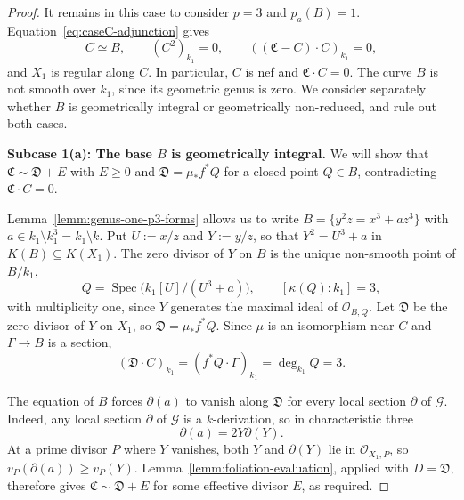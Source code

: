 \documentclass[10pt,abstract=true]{scrartcl}
\numberwithin{equation}{section}
\theoremstyle{definition}
\theoremstyle{remark}
\begin{document}
\begin{proof}
  It remains in this case to consider $p=3$ and $p_a(B)=1$.
  Equation~\eqref{eq:caseC-adjunction} gives
  \begin{equation}\label{eq:caseC-p3-residual}
    C\simeq B,\qquad (C^2)_{k_1}=0,\qquad ((\mathfrak C-C)\cdot C)_{k_1}=0,
  \end{equation}
  and $X_1$ is regular along $C$.
  In particular, $C$ is nef and $\mathfrak C\cdot C=0$.
  The curve $B$ is not smooth over $k_1$, since its geometric genus is zero.
  We consider separately whether $B$ is geometrically integral or geometrically non-reduced, and rule out both cases.

  \par\smallskip
  \noindent\textbf{Subcase 1(a): The base $B$ is geometrically integral.}
  We will show that $\mathfrak C\sim\mathfrak D+E$ with $E\ge0$ and $\mathfrak D=\mu_*f^*Q$ for a closed point $Q\in B$, contradicting $\mathfrak C\cdot C=0$.

  Lemma~\ref{lemm:genus-one-p3-forms} allows us to write $B=\{y^2z=x^3+az^3\}$ with $a\in k_1\setminus k_1^3=k_1\setminus k$.
  Put $U:=x/z$ and $Y:=y/z$, so that $Y^2=U^3+a$ in $K(B)\subseteq K(X_1)$.
  The zero divisor of $Y$ on $B$ is the unique non-smooth point of $B/k_1$,
  \[
    Q=\operatorname{Spec}\bigl(k_1[U]/(U^3+a)\bigr),\qquad [\kappa(Q):k_1]=3,
  \]
  with multiplicity one, since $Y$ generates the maximal ideal of $\mathcal O_{B,Q}$.
  Let $\mathfrak D$ be the zero divisor of $Y$ on $X_1$, so $\mathfrak D=\mu_*f^*Q$.
  Since $\mu$ is an isomorphism near $C$ and $\Gamma\to B$ is a section,
  \begin{equation}\label{eq:foliation-vanishing-degree}
    (\mathfrak D\cdot C)_{k_1}=(f^*Q\cdot\Gamma)_{k_1}=\deg_{k_1}Q=3.
  \end{equation}

  The equation of $B$ forces $\partial(a)$ to vanish along $\mathfrak D$ for every local section $\partial$ of $\mathscr G$.
  Indeed, any local section $\partial$ of $\mathscr G$ is a $k$-derivation, so in characteristic three
  \[
    \partial(a)=2Y\partial(Y).
  \]
  At a prime divisor $P$ where $Y$ vanishes, both $Y$ and $\partial(Y)$ lie in $\mathcal O_{X_1,P}$, so $v_P(\partial(a))\geq v_P(Y)$.
  Lemma~\ref{lemm:foliation-evaluation}, applied with $D=\mathfrak D$, therefore gives $\mathfrak C\sim\mathfrak D+E$ for some effective divisor $E$, as required.




\end{proof}
\end{document}
